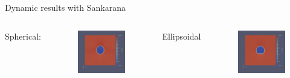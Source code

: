 \documentclass[8pt]{beamer}
\begin{document}
	\begin{frame}[t]{Dynamic results with Sankarana}
		\begin{columns}
			Spherical:
			\begin{figure}
				\centering
				\includegraphics[width=1.0\textwidth]{pics/bubbles/spherical1st.png}
			\end{figure}
			
			Ellipsoidal
			\begin{figure}
				\centering
				\includegraphics[width=1.0\textwidth]{pics/bubbles/ellipsoidal1st.png}
			\end{figure}
		

\end{columns}
\end{frame}
\end{document}
